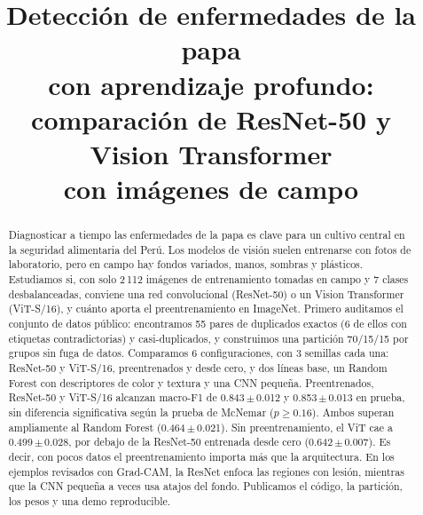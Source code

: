 \documentclass[conference,a4paper]{IEEEtran}
\newcommand{\pmsd}[2]{#1\,$\pm$\,#2}
\begin{document}
\title{Detección de enfermedades de la papa\\
con aprendizaje profundo:\\
comparación de ResNet-50 y Vision Transformer\\
con imágenes de campo}

\author{
}

\maketitle

\begin{abstract}
Diagnosticar a tiempo las enfermedades de la papa es clave para un cultivo central en la seguridad alimentaria del Perú. Los modelos de visión suelen entrenarse con fotos de laboratorio, pero en campo hay fondos variados, manos, sombras y plásticos. Estudiamos si, con solo 2\,112 imágenes de entrenamiento tomadas en campo y 7 clases desbalanceadas, conviene una red convolucional (ResNet-50) o un Vision Transformer (ViT-S/16), y cuánto aporta el preentrenamiento en ImageNet. Primero auditamos el conjunto de datos público: encontramos 55 pares de duplicados exactos (6 de ellos con etiquetas contradictorias) y casi-duplicados, y construimos una partición 70/15/15 por grupos sin fuga de datos. Comparamos 6 configuraciones, con 3 semillas cada una: ResNet-50 y ViT-S/16, preentrenados y desde cero, y dos líneas base, un Random Forest con descriptores de color y textura y una CNN pequeña. Preentrenados, ResNet-50 y ViT-S/16 alcanzan macro-F1 de \pmsd{0.843}{0.012} y \pmsd{0.853}{0.013} en prueba, sin diferencia significativa según la prueba de McNemar ($p\geq0.16$). Ambos superan ampliamente al Random Forest (\pmsd{0.464}{0.021}). Sin preentrenamiento, el ViT cae a \pmsd{0.499}{0.028}, por debajo de la ResNet-50 entrenada desde cero (\pmsd{0.642}{0.007}). Es decir, con pocos datos el preentrenamiento importa más que la arquitectura. En los ejemplos revisados con Grad-CAM, la ResNet enfoca las regiones con lesión, mientras que la CNN pequeña a veces usa atajos del fondo. Publicamos el código, la partición, los pesos y una demo reproducible.
\end{abstract}
\end{document}
